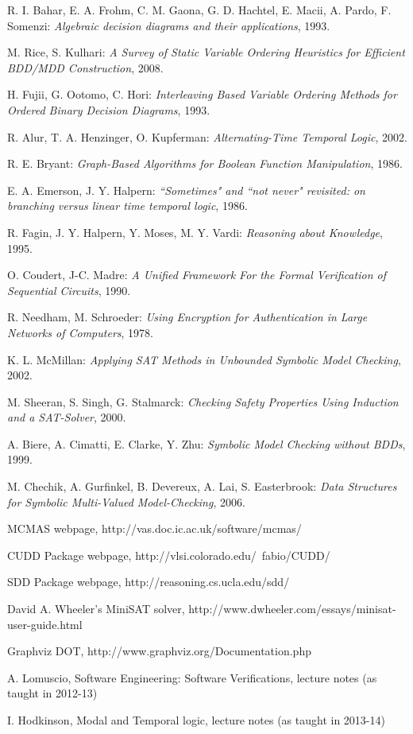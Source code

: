 \documentclass[11pt]{report}
\begin{document}
\begin{thebibliography}{9}
  R. I. Bahar, E. A. Frohm, C. M. Gaona, G. D. Hachtel, E. Macii, A. Pardo, F. Somenzi:\textit{
Algebraic decision diagrams and their applications}, 1993.

 M. Rice, S. Kulhari:\textit{ A Survey of Static Variable Ordering Heuristics for Efficient BDD/MDD Construction}, 2008.

 H. Fujii, G. Ootomo, C. Hori: \textit{Interleaving Based Variable Ordering Methods for Ordered Binary Decision Diagrams}, 1993.

 R. Alur, T. A. Henzinger, O. Kupferman: \textit{Alternating-Time Temporal Logic}, 2002.

 R. E. Bryant: \textit{Graph-Based Algorithms
for Boolean Function Manipulation}, 1986.

  	E. A. Emerson, J. Y. Halpern:\textit{
``Sometimes" and ``not never" revisited: on branching versus linear time temporal logic}, 1986.
	
R. Fagin, J. Y. Halpern, Y. Moses, M. Y. Vardi: \textit{Reasoning about Knowledge}, 1995.

 O. Coudert, J-C. Madre: \textit{A Unified Framework For the Formal Verification of Sequential Circuits}, 1990.

 R. Needham, M. Schroeder: \textit{Using Encryption for Authentication in Large Networks of Computers}, 1978.

 K. L. McMillan: \textit{Applying SAT Methods in Unbounded Symbolic Model Checking}, 2002. 

 M. Sheeran, S. Singh, G. Stalmarck: \textit{Checking Safety Properties Using Induction
and a SAT-Solver}, 2000.

 A. Biere, A. Cimatti, E. Clarke, Y. Zhu: \textit{Symbolic Model Checking without BDDs}, 1999. 

M. Chechik, A. Gurfinkel, B. Devereux, A. Lai, S. Easterbrook: \textit{Data Structures for Symbolic Multi-Valued Model-Checking}, 2006.

 MCMAS webpage, http://vas.doc.ic.ac.uk/software/mcmas/

 CUDD Package webpage, http://vlsi.colorado.edu/~fabio/CUDD/

 SDD Package webpage, http://reasoning.cs.ucla.edu/sdd/

 David A. Wheeler's MiniSAT solver,  http://www.dwheeler.com/essays/minisat-user-guide.html

Graphviz DOT, http://www.graphviz.org/Documentation.php

 A. Lomuscio, Software Engineering: Software Verifications, lecture notes (as taught in 2012-13)

 I. Hodkinson, Modal and Temporal logic, lecture notes (as taught in 2013-14)

\end{thebibliography}
\end{document}
